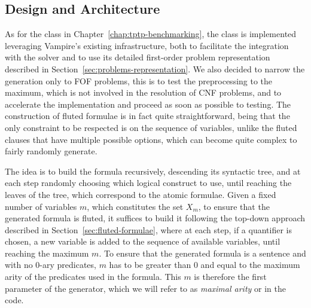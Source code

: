 \subsection{Design and Architecture}\label{subsec:design-and-implementation}
As for the  class in Chapter~\ref{chap:tptp-benchmarking}, the  class is implemented leveraging Vampire's existing infrastructure, both to facilitate the integration with the solver and to use its detailed first-order problem representation described in Section~\ref{sec:problems-representation}.
We also decided to narrow the generation only to FOF problems, this is to test the preprocessing to the maximum, which is not involved in the resolution of CNF problems, and to accelerate the implementation and proceed as soon as possible to testing.
The construction of fluted formulae is in fact quite straightforward, being that the only constraint to be respected is on the sequence of variables, unlike the fluted clauses that have multiple possible options, which can become quite complex to fairly randomly generate.

The idea is to build the formula recursively, descending its syntactic tree, and at each step randomly choosing which logical construct to use, until reaching the leaves of the tree, which correspond to the atomic formulae.
Given a fixed number of variables \(m\), which constitutes the set \(X_m\), to ensure that the generated formula is fluted, it suffices to build it following the top-down approach described in Section~\ref{sec:fluted-formulae}, where at each step, if a quantifier is chosen, a new variable is added to the sequence of available variables, until reaching the maximum \(m\).
To ensure that the generated formula is a sentence and with no 0-ary predicates, \(m\) has to be greater than 0 and equal to the maximum arity of the predicates used in the formula.
This \(m\) is therefore the first parameter of the generator, which we will refer to as \emph{maximal arity} or  in the code.

